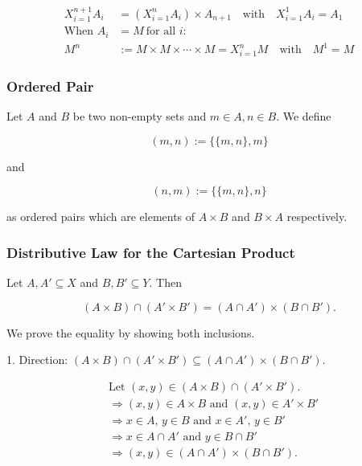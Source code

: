 \begin{align*}
	X_{i = 1}^{n + 1} A_i & = \left( X_{i = 1}^{n} A_i \right) \times A_{n + 1} \quad \text{with} \quad X_{i = 1}^{1} A_i = A_1 \\
	\text{When } A_i      & = M \ \text{for all } i:                                                                            \\
	M^n                   & := M \times M \times \cdots \times M = X_{i = 1}^{n} M \quad \text{with} \quad M^1 = M
\end{align*}

\subsubsection{Ordered Pair}

Let \(A\) and \(B\) be two non-empty sets and \(m \in A, n \in B\). We define 

\[
	(m,n) := \{\{m, n\}, {m}\}	
\]

and 

\[
	(n,m) := \{\{m, n\}, {n}\}	
\]

as ordered pairs which are elements of \(A \times B\) and \(B \times A\) respectively.

\subsubsection{Distributive Law for the Cartesian Product}

Let \(A, A' \subseteq X\) and \(B, B' \subseteq Y\). Then

\[
	(A \times B) \cap (A' \times B') = (A \cap A') \times (B \cap B').
\]

We prove the equality by showing both inclusions.

1. Direction: \((A \times B) \cap (A' \times B') \subseteq (A \cap A') \times (B \cap B')\).

\begin{align*}
	&\text{Let } (x,y) \in (A \times B) \cap (A' \times B'). \\
	&\Rightarrow (x,y) \in A \times B \text{ and } (x,y) \in A' \times B' \\
	&\Rightarrow x \in A,\, y \in B \text{ and } x \in A',\, y \in B' \\
	&\Rightarrow x \in A \cap A' \text{ and } y \in B \cap B' \\
	&\Rightarrow (x,y) \in (A \cap A') \times (B \cap B').
\end{align*}

